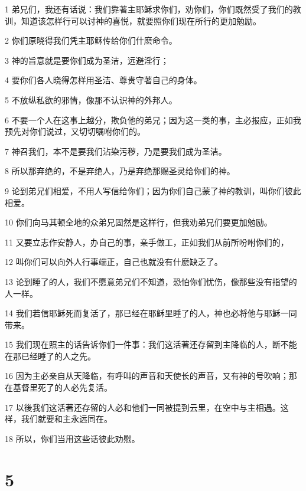 \par 1 弟兄们，我还有话说：我们靠著主耶稣求你们，劝你们，你们既然受了我们的教训，知道该怎样行可以讨神的喜悦，就要照你们现在所行的更加勉励。
\par 2 你们原晓得我们凭主耶稣传给你们什麽命令。
\par 3 神的旨意就是要你们成为圣洁，远避淫行；
\par 4 要你们各人晓得怎样用圣洁、尊贵守著自己的身体。
\par 5 不放纵私欲的邪情，像那不认识神的外邦人。
\par 6 不要一个人在这事上越分，欺负他的弟兄；因为这一类的事，主必报应，正如我预先对你们说过，又切切嘱咐你们的。
\par 7 神召我们，本不是要我们沾染污秽，乃是要我们成为圣洁。
\par 8 所以那弃绝的，不是弃绝人，乃是弃绝那赐圣灵给你们的神。
\par 9 论到弟兄们相爱，不用人写信给你们；因为你们自己蒙了神的教训，叫你们彼此相爱。
\par 10 你们向马其顿全地的众弟兄固然是这样行，但我劝弟兄们要更加勉励。
\par 11 又要立志作安静人，办自己的事，亲手做工，正如我们从前所吩咐你们的，
\par 12 叫你们可以向外人行事端正，自己也就没有什麽缺乏了。
\par 13 论到睡了的人，我们不愿意弟兄们不知道，恐怕你们忧伤，像那些没有指望的人一样。
\par 14 我们若信耶稣死而复活了，那已经在耶稣里睡了的人，神也必将他与耶稣一同带来。
\par 15 我们现在照主的话告诉你们一件事：我们这活著还存留到主降临的人，断不能在那已经睡了的人之先。
\par 16 因为主必亲自从天降临，有呼叫的声音和天使长的声音，又有神的号吹响；那在基督里死了的人必先复活。
\par 17 以後我们这活著还存留的人必和他们一同被提到云里，在空中与主相遇。这样，我们就要和主永远同在。
\par 18 所以，你们当用这些话彼此劝慰。

\chapter{5}

